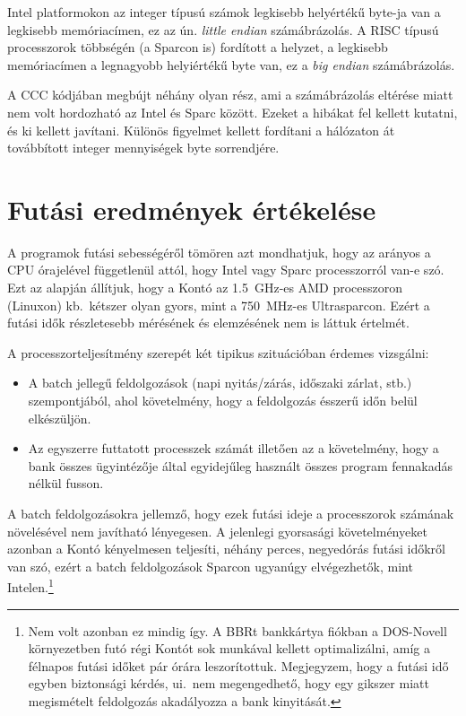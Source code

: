 Intel platformokon az integer típusú számok legkisebb helyértékű
byte-ja van a legkisebb memóriacímen, ez az ún. \emph{little endian}
számábrázolás. A RISC típusú processzorok többségén (a Sparcon is)
fordított a helyzet, a legkisebb memóriacímen a legnagyobb 
helyiértékű byte van, ez a \emph{big endian} számábrázolás. 

A CCC kódjában megbújt néhány olyan rész, ami a számábrázolás
eltérése miatt nem volt hordozható az Intel és Sparc között.
Ezeket a hibákat fel kellett kutatni, és ki kellett javítani. 
Különös figyelmet kellett fordítani a hálózaton át továbbított integer
mennyiségek byte sorrendjére.


\section{Futási eredmények értékelése}

A programok futási sebességéről tömören azt mondhatjuk, hogy
az arányos a CPU órajelével függetlenül attól, hogy Intel vagy
Sparc processzorról van-e szó. Ezt az alapján állítjuk, hogy a Kontó
az 1.5~GHz-es AMD processzoron (Linuxon) kb.\ kétszer olyan gyors, 
mint a 750~MHz-es Ultrasparcon. Ezért a futási idők részletesebb mérésének
és elemzésének nem is láttuk értelmét.

A processzorteljesítmény szerepét két tipikus szituációban
érdemes vizsgálni:
\begin{itemize}
\item 
  A batch jellegű feldolgozások (napi nyitás/zárás, időszaki zárlat, stb.)
  szempontjából, ahol követelmény, hogy a feldolgozás ésszerű időn
  belül elkészüljön.
\item
  Az egyszerre futtatott processzek számát illetően az a követelmény,
  hogy a bank összes ügyintézője által egyidejűleg használt összes program
  fennakadás nélkül fusson.
\end{itemize}
 
A batch feldolgozásokra jellemző, hogy ezek futási ideje a processzorok
számának növelésével nem javítható lényegesen. A jelenlegi gyorsasági
követelményeket azonban a Kontó kényelmesen teljesíti, néhány perces, 
negyedórás futási időkről van szó, ezért a batch feldolgozások
Sparcon ugyanúgy elvégezhetők, mint Intelen.\footnote{
Nem volt azonban ez mindig így. A BBRt bankkártya fiókban 
a DOS-Novell környezetben futó régi Kontót sok munkával kellett
optimalizálni, amíg a félnapos futási időket pár órára leszorítottuk.
Megjegyzem, hogy a futási idő egyben biztonsági kérdés, ui.\
nem megengedhető, hogy egy gikszer miatt megismételt feldolgozás
akadályozza a bank kinyitását.}

